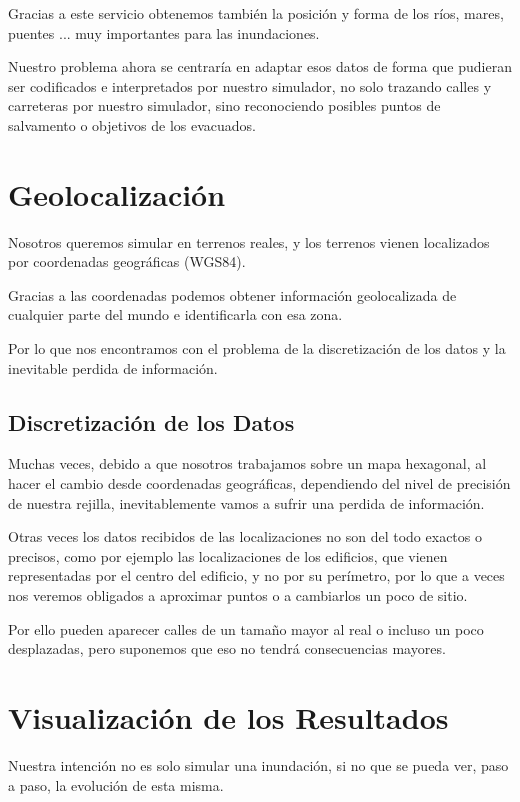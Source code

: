Gracias a este servicio obtenemos también la posición y forma de los ríos,
mares, puentes ... muy importantes para las inundaciones. 

Nuestro problema ahora se centraría en adaptar esos datos de forma que pudieran
ser codificados e interpretados por nuestro simulador, no solo trazando calles
y carreteras por nuestro simulador, sino reconociendo posibles puntos de
salvamento o objetivos de los evacuados.

\section*{Geolocalización}

Nosotros queremos simular en terrenos reales, y los terrenos vienen
localizados por coordenadas geográficas (WGS84).

Gracias a las coordenadas podemos obtener información geolocalizada de
cualquier parte del mundo e identificarla con esa zona.

Por lo que nos encontramos con el problema de la discretización de los
datos y la inevitable perdida de información.

\subsection*{Discretización de los Datos}
Muchas veces, debido a que nosotros trabajamos sobre un mapa hexagonal, al
hacer el cambio desde coordenadas geográficas, dependiendo del nivel de
precisión de nuestra rejilla, inevitablemente vamos a sufrir una perdida de
información.

Otras veces los datos recibidos de las localizaciones no son del todo exactos o
precisos, como por ejemplo las localizaciones de los edificios, que vienen
representadas por el centro del edificio, y no por su perímetro, por lo que a
veces nos veremos obligados a aproximar puntos o a cambiarlos un poco de sitio.

Por ello pueden aparecer calles de un tamaño mayor al real o incluso un poco
desplazadas, pero suponemos que eso no tendrá consecuencias mayores.

\section*{Visualización de los Resultados}

Nuestra intención no es solo simular una inundación, si no que se pueda ver,
paso a paso, la evolución de esta misma. 

